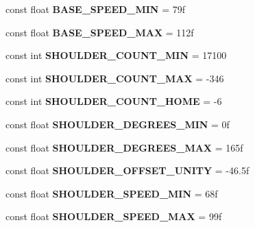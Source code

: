 \begin{DoxyCompactItemize}
const float {\bfseries B\+A\+S\+E\+\_\+\+S\+P\+E\+E\+D\+\_\+\+M\+IN} = 79f
\item 
\mbox{\label{class_scorbot_e_r_v_plus_a92933bf3621669210a3ffb5bfa47674e}} 
const float {\bfseries B\+A\+S\+E\+\_\+\+S\+P\+E\+E\+D\+\_\+\+M\+AX} = 112f
\item 
\mbox{\label{class_scorbot_e_r_v_plus_a4d0249ecba099244b4f4ed7efa59665d}} 
const int {\bfseries S\+H\+O\+U\+L\+D\+E\+R\+\_\+\+C\+O\+U\+N\+T\+\_\+\+M\+IN} = 17100
\item 
\mbox{\label{class_scorbot_e_r_v_plus_a5d00b0b6d76e7c424f4ca94e098595e2}} 
const int {\bfseries S\+H\+O\+U\+L\+D\+E\+R\+\_\+\+C\+O\+U\+N\+T\+\_\+\+M\+AX} = -\/346
\item 
\mbox{\label{class_scorbot_e_r_v_plus_a8b0df0bc290d9070aae27ec17cd5a1a3}} 
const int {\bfseries S\+H\+O\+U\+L\+D\+E\+R\+\_\+\+C\+O\+U\+N\+T\+\_\+\+H\+O\+ME} = -\/6
\item 
\mbox{\label{class_scorbot_e_r_v_plus_a36c42bc4fa0138dd783133c66fe44f06}} 
const float {\bfseries S\+H\+O\+U\+L\+D\+E\+R\+\_\+\+D\+E\+G\+R\+E\+E\+S\+\_\+\+M\+IN} = 0f
\item 
\mbox{\label{class_scorbot_e_r_v_plus_a73d4d1e3f2e76c2cab6d36f8daef78b8}} 
const float {\bfseries S\+H\+O\+U\+L\+D\+E\+R\+\_\+\+D\+E\+G\+R\+E\+E\+S\+\_\+\+M\+AX} = 165f
\item 
\mbox{\label{class_scorbot_e_r_v_plus_acafc94d7ca211a53499459cb007b8bcb}} 
const float {\bfseries S\+H\+O\+U\+L\+D\+E\+R\+\_\+\+O\+F\+F\+S\+E\+T\+\_\+\+U\+N\+I\+TY} = -\/46.\+5f
\item 
\mbox{\label{class_scorbot_e_r_v_plus_a52042f1e92bdf831a51aff1a05fbf1ca}} 
const float {\bfseries S\+H\+O\+U\+L\+D\+E\+R\+\_\+\+S\+P\+E\+E\+D\+\_\+\+M\+IN} = 68f
\item 
\mbox{\label{class_scorbot_e_r_v_plus_a8df7c024790ab4043a6c1a90529b11ff}} 
const float {\bfseries S\+H\+O\+U\+L\+D\+E\+R\+\_\+\+S\+P\+E\+E\+D\+\_\+\+M\+AX} = 99f

\end{DoxyCompactItemize}
